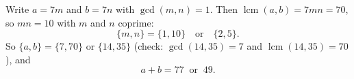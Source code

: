 Write $a=7m$ and $b=7n$ with $\gcd(m,n)=1$. Then $\operatorname{lcm}(a,b)=7mn=70$, so $mn=10$ with $m$ and $n$ coprime:
\[
\{m,n\}=\{1,10\}\quad\text{or}\quad\{2,5\}.
\]
So $\{a,b\}=\{7,70\}$ or $\{14,35\}$ (check: $\gcd(14,35)=7$ and $\operatorname{lcm}(14,35)=70$), and
\[
a+b=\boxed{77\ \text{ or }\ 49}.
\]

